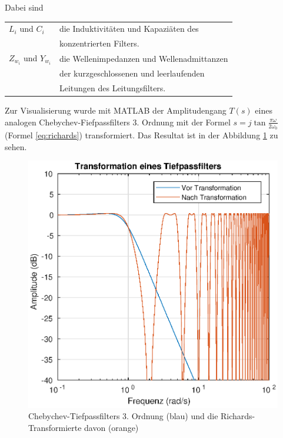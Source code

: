Dabei sind

\begin{tabular}{ll}
    $L_i$ und $C_i$         & die Induktivit\"aten und Kapazi\"aten des \\
                            & konzentrierten Filters. \\
    $Z_{w_i}$ und $Y_{w_i}$ & die Wellenimpedanzen und Wellenadmittanzen \\
                            & der kurzgeschlossenen und leerlaufenden \\
                            & Leitungen des Leitungsfilters. \\
\end{tabular}

Zur Visualisierung wurde mit MATLAB der  Amplitudengang  $T(s)$ eines analogen
Chebychev-Fiefpassfilters 3.  Ordnung  mit  der  Formel  $s  =  j\tan\frac{\pi
\omega}{2\omega_0}$ (Formel \ref{eq:richards}) transformiert. Das Resultat ist
in der Abbildung \ref{fig:richards-example} zu sehen.

\begin{figure}[h!]
    \centering
    \includegraphics[width=\imagewidth]{images/richards-lowpass-example}
    \caption{Chebychev-Tiefpassfilters 3. Ordnung (blau) und die Richards-Transformierte davon (orange)}
    \label{fig:richards-example}
\end{figure}

